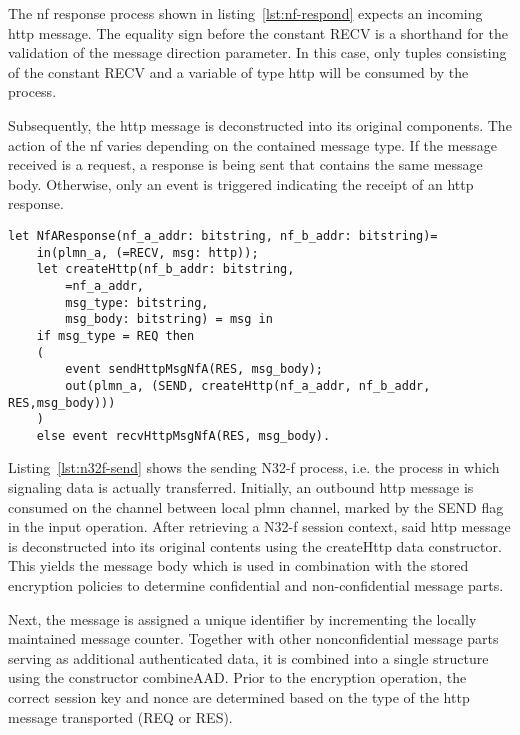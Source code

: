 The \gls{nf} response process shown in listing~\ref{lst:nf-respond} expects an incoming \gls{http} message.
The equality sign before the constant {\sffamily RECV} is a shorthand for the validation of the message direction parameter.
In this case, only tuples consisting of the constant {\sffamily RECV} and a variable of type {\sffamily http} will be consumed by the process.

Subsequently, the \gls{http} message is deconstructed into its original components.
The action of the \gls{nf} varies depending on the contained message type.
If the message received is a request, a response is being sent that contains the same message body.
Otherwise, only an event is triggered indicating the receipt of an \gls{http} response.

\begin{lstlisting}[caption={Definition of the responding NF process},label={lst:nf-respond},firstnumber=758]
let NfAResponse(nf_a_addr: bitstring, nf_b_addr: bitstring)=
    in(plmn_a, (=RECV, msg: http));
    let createHttp(nf_b_addr: bitstring,
        =nf_a_addr,
        msg_type: bitstring,
        msg_body: bitstring) = msg in
    if msg_type = REQ then
    (
        event sendHttpMsgNfA(RES, msg_body);
        out(plmn_a, (SEND, createHttp(nf_a_addr, nf_b_addr, RES,msg_body)))
    )
    else event recvHttpMsgNfA(RES, msg_body).
\end{lstlisting}

Listing~\ref{lst:n32f-send} shows the sending N32-f process, i.e. the process in which signaling data is actually transferred.
Initially, an outbound \gls{http} message is consumed on the channel between local \gls{plmn} channel, marked by the {\sffamily SEND} flag in the input operation.
After retrieving a N32-f session context, said \gls{http} message is deconstructed into its original contents using the {\sffamily createHttp} data constructor.
This yields the message body which is used in combination with the stored encryption policies to determine confidential and non-confidential message parts.

Next, the message is assigned a unique identifier by incrementing the locally maintained message counter.
Together with other nonconfidential message parts serving as additional authenticated data, it is combined into a single structure using the constructor {\sffamily combineAAD}.
Prior to the encryption operation, the correct session key and nonce are determined based on the type of the \gls{http} message transported ({\sffamily REQ} or {\sffamily RES}).

